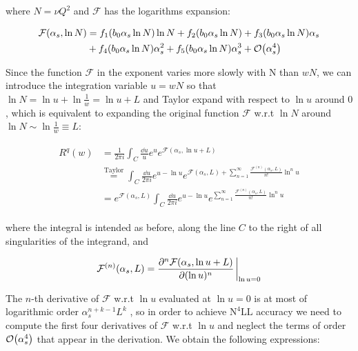 \documentclass[../main.tex]{subfiles}
\begin{document}
where $N=\nu Q^2$ and $\mathcal{F}$ has the logarithms expansion:

\begin{align}
    \begin{split}
    \mathcal{F}(\alpha_s,\ln N) &= f_1(b_0 \alpha_s \ln N) \ln N + f_2(b_0 \alpha_s \ln N) + f_3(b_0 \alpha_s \ln N) \alpha_s \\
    &+ f_4(b_0 \alpha_s \ln N) \alpha_s^2 + f_5(b_0 \alpha_s \ln N) \alpha_s^3 + \order{\alpha_s^4}
\end{split}
\end{align}

Since the function $\mathcal{F}$ in the exponent varies more slowly with N than $wN$, we can introduce the integration variable $u=wN$
so that $\ln N = \ln u +\ln \frac{1}{w} = \ln u + L$ and Taylor expand with respect to $\ln u$ around $0$, which is equivalent to expanding 
the original function $\mathcal{F}$ w.r.t $\ln N$ around $\ln N \sim \ln \frac{1}{w}\equiv L$:

\begin{align}
    \begin{split}\label{eq:Rw expansion}
       R^q(w) &= \frac{1}{2\pi i} \int_C \frac{\dd u}{u} e^{u} e^{\mathcal{F}(\alpha_s,\ln u + L)} \\
       &\stackrel{\text{Taylor}}{=} \int_C \frac{\dd u}{2\pi i} e^{u-\ln u} e^{\mathcal{F}(\alpha_s,L)+\sum_{n=1}^\infty \frac{\mathcal{F}^{(n)}(\alpha_s,L)}{n!}  \ln^n u}\\
       &= e^{\mathcal{F}(\alpha_s,L)} \int_C \frac{\dd u}{2\pi i} e^{u-\ln u} e^{\sum_{n=1}^\infty \frac{\mathcal{F}^{(n)}(\alpha_s,L)}{n!}  \ln^n u}
    \end{split}
\end{align}

where the integral is intended as before, along the line $C$ to the right of all singularities of the integrand, and 

\begin{equation}
    \mathcal{F}^{(n)}(\alpha_s,L) = \pdv[n]{\mathcal{F}(\alpha_s,\ln u + L )}{(\ln u)} \eval_{\ln u = 0}
\end{equation}

The $n$-th derivative of $\mathcal{F}$ w.r.t $\ln u$ evaluated at $\ln u = 0$ is 
at most of logarithmic order $\alpha_s^{n+k-1}L^k$ \cite{CATANI19933}, so in order to achieve $\text{N}^4\text{LL}$ accuracy we need to compute the first four derivatives of $\mathcal{F}$ w.r.t $\ln u$ and 
neglect the terms of order $\order{\alpha_s^4}$ that appear in the derivation. We obtain the following expressions: 
\end{document}
